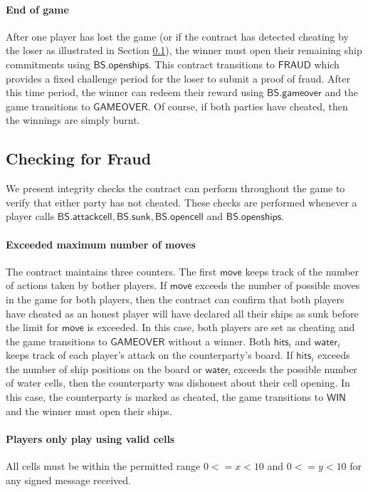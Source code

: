 \documentclass{llncs}
\newcommand{\gamewinner}{\mathsf{WIN}}
\newcommand{\gamefraud}{\mathsf{FRAUD}}
\newcommand{\gamefinished}{\mathsf{GAMEOVER}}
\newcommand{\battleshipattackcell}{\mathsf{BS.attackcell}}
\newcommand{\battleshiprevealcell}{\mathsf{BS.opencell}}
\newcommand{\battleshipsinking}{\mathsf{BS.sunk}}
\newcommand{\battleshiprevealships}{\mathsf{BS.openships}}
\newcommand{\battleshipgameover}{\mathsf{BS.gameover}}
\begin{document}
	\paragraph{End of game} 
	After one player has lost the game (or if the contract has detected cheating by the loser as illustrated in Section \ref{sec:fraud}), the winner must open their remaining ship commitments using $\battleshiprevealships$.
	This contract transitions to $\gamefraud$ which provides a fixed challenge period for the loser to submit a proof of fraud. 
	After this time period, the winner can redeem their reward using $\battleshipgameover$  and the game  transitions to $\gamefinished$. 
	Of course, if both parties have cheated, then the winnings are simply burnt. 
	
	\subsection{Checking for Fraud} \label{sec:fraud}
	
	We present integrity checks the contract can perform throughout the game to verify that either party has not cheated. 
	These checks are performed whenever a player calls $\battleshipattackcell, \battleshipsinking, \battleshiprevealcell$ and $\battleshiprevealships$.
	
	
	\paragraph{Exceeded maximum number of moves} 
	The contract maintains three counters.
	The first $\mathsf{move}$ keeps track of the number of actions taken by bother players.
	If $\mathsf{move}$ exceeds the number of possible moves in the game for both players, then the contract can confirm that both players have cheated as an honest player will have declared all their ships as sunk before the limit for $\mathsf{move}$ is exceeded.
	In this case, both players are set as cheating and the game transitions to $\gamefinished$ without a winner. 
	Both $\mathsf{hits}_{i}$ and $\mathsf{water}_{i}$ keeps track of each player's attack on the counterparty's board. 
	If $\mathsf{hits}_{i}$ exceeds the number of ship positions on the board or $\mathsf{water_{i}}$ exceeds the possible number of water cells, then the counterparty was dishonest about their cell opening. 
	In this case, the counterparty is marked as cheated, the game transitions to $\gamewinner$ and the winner must open their ships.  
	
	\paragraph{Players only play using valid cells}  
	All cells must be within the permitted range $0 <= x < 10$ and $0 <= y < 10$ for any signed message received. 
	
\end{document}
